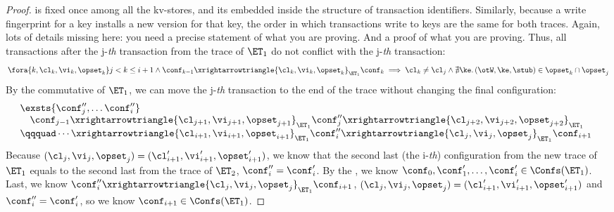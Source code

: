 \begin{proof}
{is fixed once among all the kv-stores, and its embedded inside the structure of transaction identifiers.}
Similarly, because a write fingerprint for a key installs a new version for that key, the order in which transactions write to keys are the same for both traces.
\ac{Again, lots of details missing here: you need a precise statement of what you are proving. And a proof of what you are proving.}
Thus, all transactions after the j-\emph{th} transaction from the trace of \( \ET_1 \) do not conflict with the j-\emph{th} transaction:
\[
    \fora{k, \cl_k, \vi_k, \opset_k} j < k \leq i + 1 \land \conf_{k-1} \xrightarrowtriangle{\cl_k, \vi_k, \opset_k}_{\ET_{1}} \conf_k \implies \cl_k \neq \cl_j \land \nexists{\ke} \ldotp (\otW, \ke, \stub) \in \opset_k \cap \opset_j
\]
By the commutative of \( \ET_1 \), we can move the j-\emph{th} transaction to the end of the trace without changing the final configuration:
\[
\begin{array}{@{}l}
    \exsts{\conf''_{j}, \dots \conf''_i}  \\
    \quad \conf_{j-1} \xrightarrowtriangle{\cl_{j+1}, \vi_{j+1}, \opset_{j+1}}_{\ET_{1}} \conf''_{j} \xrightarrowtriangle{\cl_{j+2}, \vi_{j+2}, \opset_{j+2}}_{\ET_{1}} \\
    \qqquad \cdots \xrightarrowtriangle{\cl_{i+1}, \vi_{i+1}, \opset_{i+1}}_{\ET_{1}} \conf''_i \xrightarrowtriangle{\cl_{j}, \vi_{j}, \opset_{j}}_{\ET_{1}} \conf_{i+1}
\end{array}
\]
Because \( (\cl_{j}, \vi_{j}, \opset_{j}) = (\cl'_{i+1}, \vi'_{i+1}, \opset'_{i+1}) \), 
we know that the second last (the i-\emph{th}) configuration from the new trace of \( \ET_1 \) equals to the second last from the trace of \( \ET_2 \), \ie \( \conf''_i = \conf'_i \).
By the \ih, we know \( \conf_0, \conf'_1, \dots, \conf'_i \in \Confs(\ET_{1}) \).
Last, we know \( \conf''_i \xrightarrowtriangle{\cl_{j}, \vi_{j}, \opset_{j}}_{\ET_1} \conf_{i+1} \), \( (\cl_{j}, \vi_{j}, \opset_{j}) = (\cl'_{i+1}, \vi'_{i+1}, \opset'_{i+1}) \) and \( \conf''_i = \conf'_i \), so we know \( \conf_{i+1} \in \Confs(\ET_1)\).
\end{proof}

